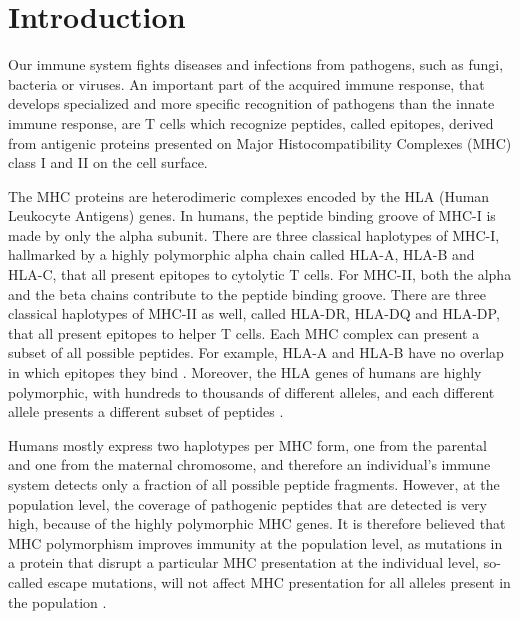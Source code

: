 \section{Introduction}


Our immune system fights diseases and infections from pathogens, 
such as fungi, bacteria or viruses. 
An important part of the acquired immune response, 
that develops specialized and more specific recognition of pathogens 
than the innate immune response, 
are T cells which recognize peptides, called epitopes, derived from antigenic proteins presented on Major Histocompatibility Complexes (MHC) class I and II on the cell surface. 


The MHC proteins are heterodimeric complexes encoded by the
HLA (Human Leukocyte Antigens) genes.
In humans, the peptide binding groove of MHC-I is made by only the alpha subunit. There are three classical haplotypes of MHC-I, hallmarked by a highly polymorphic alpha chain called HLA-A, HLA-B and HLA-C, that all present epitopes to cytolytic T cells. 
For MHC-II, both the alpha and the beta chains contribute to the peptide binding groove. There are three classical haplotypes of MHC-II as well, called HLA-DR, HLA-DQ and HLA-DP, that all present epitopes to helper T cells.
Each MHC complex can present a subset of all possible peptides.
For example, HLA-A and HLA-B have no overlap in which
epitopes they bind \cite{lund2004definition}.
Moreover, the HLA genes of humans are highly polymorphic, with hundreds 
to thousands of different alleles, 
and each different allele presents a different subset of peptides \cite{marsh2010nomenclature}.


Humans mostly express two haplotypes per MHC form, one from the parental and one from the maternal chromosome, 
and therefore an individual's immune system detects 
only a fraction of all possible peptide fragments. 
However, at the population level, the coverage of pathogenic peptides that are detected 
is very high, because of the highly polymorphic MHC genes.
It is therefore believed that MHC polymorphism improves immunity at the population level, 
as mutations in a protein that disrupt a particular MHC presentation at the individual level, 
so-called escape mutations, 
will not affect MHC presentation for all alleles present in the population \cite{sommer2005importance}.

